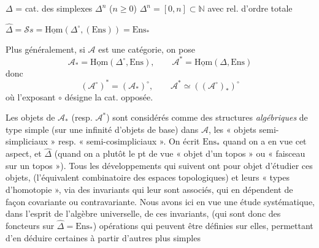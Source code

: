 \documentclass[11pt,a4paper]{article}
\begin{document}

$\Delta$ = cat. des simplexes $\Delta^{n}$ ($n \geqslant 0$) \qquad
$\Delta^{n} = [0, n] \subset \mathbb{N}$ avec rel. d'ordre totale

$\widehat{\Delta} = \mathcal{S}s = \underline{\mathrm{Hom}}(\Delta^{\circ}, (\mathrm{Ens})) = \mathrm{Ens}_{*}$

Plus généralement, si $\mathcal{A}$ est une catégorie, on pose
\[
  \mathcal{A}_{*} = \underline{\mathrm{Hom}}(\Delta^{\circ}, \mathrm{Ens}), \qquad
  \mathcal{A}^{*} = \underline{\mathrm{Hom}}(\Delta, \mathrm{Ens})
\]
donc
\[
  (\mathcal{A}^{\circ})^{*} = (\mathcal{A}_{*})^{\circ}, \qquad
  \mathcal{A}^{*} \simeq ((\mathcal{A}^{\circ})_{*})^{\circ}
\]
où l'exposant $\circ$ désigne la \add{\ill{}} cat. opposée.


Les objets de $\mathcal{A}_{*}$ (resp. $\mathcal{A}^{*}$) sont considérés comme des
structures \emph{algébriques} de type simple (sur une infinité d'objets de base) dans
$\mathcal{A}$, les « objets semi-simpliciaux » resp. « semi-cosimpliciaux ». On écrit
$\mathrm{Ens}_{*}$ quand on a en vue cet aspect, et $\widehat{\Delta}$  (quand on a plutôt le pt de vue « objet d'un topos »
ou « faisceau sur un topos »). Tous les développements qui suivent ont pour objet
d'étudier ces objets, (l'équivalent combinatoire des espaces topologiques) et leurs
« types d'homotopie », via des invariants qui leur sont associés, qui en dépendent
de façon covariante ou contravariante. Nous avons ici en vue une étude
systématique, dans l'esprit de l'algèbre universelle, de ces invariants, (qui sont
donc des foncteurs sur $\widehat{\Delta} = \mathrm{Ens}_{*}$)   opérations qui peuvent être définies sur elles,
permettant d'en déduire certaines  à partir d'autres plus
simples
\end{document}

